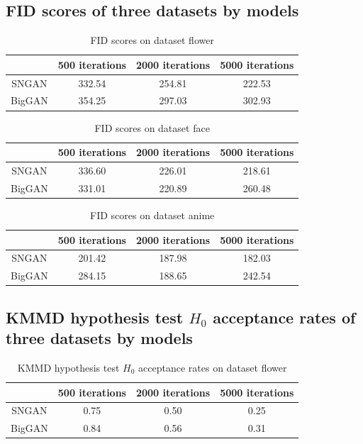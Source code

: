 \documentclass{article}
\begin{document}
\newpage
\subsection*{FID scores of three datasets by models}
\begin{table}[h!]
 \centering
 \caption{FID scores on dataset flower}
 \begin{tabular}{||c | c | c | c||}
 \hline
 & 500 iterations & 2000 iterations & 5000 iterations \\ [0.5ex] 
 \hline\hline
 SNGAN & 332.54 & 254.81 & 222.53 \\ 
 \hline
 BigGAN & 354.25 & 297.03 & 302.93 \\
 \hline
\end{tabular}
\end{table}

\begin{table}[h!]
\centering
\caption{FID scores on dataset face}
 \begin{tabular}{||c | c | c | c||} 
 \hline
 & 500 iterations & 2000 iterations & 5000 iterations \\ [0.5ex] 
 \hline\hline
 SNGAN & 336.60 & 226.01 & 218.61 \\ 
 \hline
 BigGAN & 331.01 & 220.89 & 260.48 \\
 \hline
\end{tabular}
\end{table}

\begin{table}[h!]
\centering
\caption{FID scores on dataset anime}
 \begin{tabular}{||c | c | c | c||} 
 \hline
 & 500 iterations & 2000 iterations & 5000 iterations \\ [0.5ex] 
 \hline\hline
 SNGAN & 201.42 & 187.98 & 182.03 \\ 
 \hline
 BigGAN & 284.15 & 188.65 & 242.54 \\
 \hline
\end{tabular}
\end{table}


\subsection*{KMMD hypothesis test $H_0$ acceptance rates of three datasets by models}
\begin{table}[h!]
\centering
\caption{KMMD hypothesis test $H_0$ acceptance rates on dataset flower}
 \begin{tabular}{||c | c | c | c||} 
 \hline
 & 500 iterations & 2000 iterations & 5000 iterations \\ [0.5ex] 
 \hline\hline
 SNGAN & 0.75 & 0.50 & 0.25 \\ 
 \hline
 BigGAN & 0.84 & 0.56 & 0.31 \\
 \hline
\end{tabular}
\end{table}
\end{document}
